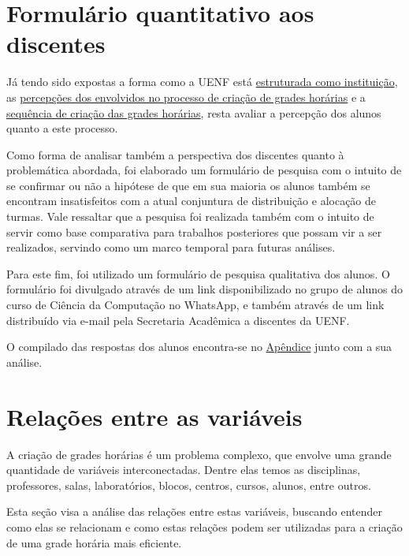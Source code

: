 \section{Formulário quantitativo aos discentes} \label{sec:formulario} %

Já tendo sido expostas a forma como a UENF está \hyperref[sec:estatuto]{estruturada como instituição}, as \hyperref[sec:entrevistas]{percepções dos envolvidos no processo de criação de grades horárias} e a \hyperref[sec:sequencia]{sequência de criação das grades horárias}, resta avaliar a percepção dos alunos quanto a este processo.

Como forma de analisar também a perspectiva dos discentes quanto à problemática abordada, foi elaborado um formulário de pesquisa com o intuito de se confirmar ou não a hipótese de que em sua maioria os alunos também se encontram insatisfeitos com a atual conjuntura de distribuição e alocação de turmas. Vale ressaltar que a pesquisa foi realizada também com o intuito de servir como base comparativa para trabalhos posteriores que possam vir a ser realizados, servindo como um marco temporal para futuras análises.

Para este fim, foi utilizado um formulário de pesquisa qualitativa dos alunos. O formulário foi divulgado através de um link disponibilizado no grupo de alunos do curso de Ciência da Computação no WhatsApp, e também através de um link distribuído via e-mail pela Secretaria Acadêmica a discentes da UENF.

O compilado das respostas dos alunos encontra-se no \hyperref[chap:Formulário de pesquisa]{Apêndice} junto com a sua análise.

\section{Relações entre as variáveis} \label{sec:relacoes}  %

A criação de grades horárias é um problema complexo, que envolve uma grande quantidade de variáveis interconectadas. Dentre elas temos as disciplinas, professores, salas, laboratórios, blocos, centros, cursos, alunos, entre outros.

Esta seção visa a análise das relações entre estas variáveis, buscando entender como elas se relacionam e como estas relações podem ser utilizadas para a criação de uma grade horária mais eficiente.

